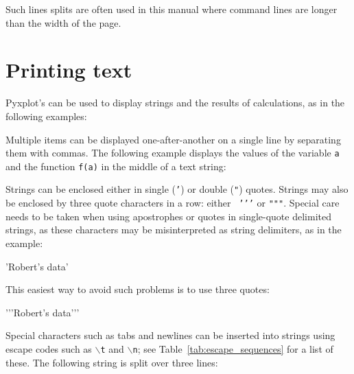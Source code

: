 \vspace{3mm}

\vspace{3mm}

\noindent Such lines splits are often used in this manual where command lines
are longer than the width of the page.

\section{Printing text}

Pyxplot's  can be used to display strings and the results of
calculations, as in the following examples:

\vspace{3mm}

\vspace{3mm}

Multiple items can be displayed one-after-another on a single line by
separating them with commas. The following example displays the values of the
variable {\tt a} and the function {\tt f(a)} in the middle of a text string:

\vspace{3mm}

\vspace{3mm}

Strings can be enclosed either in single ({\tt '}) or double ({\tt "}) quotes.
Strings may also be enclosed by three quote characters in a row: either {\tt
\textquoteright\textquoteright\textquoteright} or {\tt """}. Special care needs
to be taken when using apostrophes or quotes in single-quote delimited strings,
as these characters may be misinterpreted as string delimiters, as in the
example:

\begin{dontdo}
'Robert's data'
\end{dontdo}

\noindent This easiest way to avoid such problems is to use three quotes:

\begin{dodo}
\textquoteright\textquoteright\textquoteright Robert's data\textquoteright\textquoteright\textquoteright
\end{dodo}

Special characters such as tabs and newlines can be inserted into strings using
escape codes such as {\tt $\backslash$t} and {\tt $\backslash$n}; see
Table~\ref{tab:escape_sequences} for a list of these. The following string is
split over three lines:

